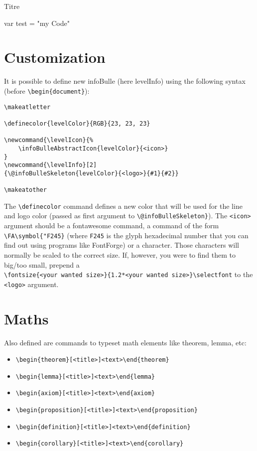\documentclass[a4paper, 11pt, oneside, fleqn]{article}
\begin{document}
\begin{CodeInfo}{Titre}
	\begin{CodeInfoLst}
var test = "my Code"
	\end{CodeInfoLst}
\end{CodeInfo}

\section{Customization}
It is possible to define new infoBulle (here levelInfo) using the following syntax (before \verb|\begin{document}|):

\begin{verbatim}
\makeatletter

\definecolor{levelColor}{RGB}{23, 23, 23}

\newcommand{\levelIcon}{%
    \infoBulleAbstractIcon{levelColor}{<icon>}
}
\newcommand{\levelInfo}[2]
{\@infoBulleSkeleton{levelColor}{<logo>}{#1}{#2}}

\makeatother
\end{verbatim}

The \verb|\definecolor| command defines a new color that will be used for the line and logo color (passed as first argument to \verb|\@infoBulleSkeleton}|). The \verb|<icon>| argument should be a fontawesome command, a command of the form \verb|\FA\symbol{"F245}| (where \verb|F245| is the glyph hexadecimal number that you can find out using programs like FontForge) or a character.
Those characters will normally be scaled to the correct size.
If, however, you were to find them to big/too small, prepend a\\\verb|\fontsize{<your wanted size>}{1.2*<your wanted size>}\selectfont| to the \verb|<logo>| argument.


\section{Maths}

Also defined are commands to typeset math elements like theorem, lemma, etc:
\begin{itemize}
	\item \verb|\begin{theorem}[<title>]<text>\end{theorem}|
	\item \verb|\begin{lemma}[<title>]<text>\end{lemma}|
	\item \verb|\begin{axiom}[<title>]<text>\end{axiom}|
	\item \verb|\begin{proposition}[<title>]<text>\end{proposition}|
	\item \verb|\begin{definition}[<title>]<text>\end{definition}|
	\item \verb|\begin{corollary}[<title>]<text>\end{corollary}|
\end{itemize}
\end{document}
